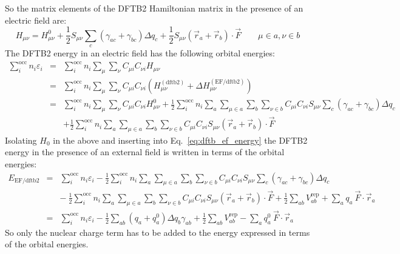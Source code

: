 \documentclass{article}
\numberwithin{equation}{section}
\begin{document}
So the matrix elements of the DFTB2 Hamiltonian matrix in the presence of an electric field  are:
\begin{equation}
    H_{\mu\nu} = H^0_{\mu\nu} + \frac{1}{2}S_{\mu\nu} \sum_c \left( \gamma_{ac} + \gamma_{bc} \right)\Delta q_c  + \frac{1}{2} S_{\mu\nu} \left( \vec{r}_a + \vec{r}_b \right) \cdot \vec{F}  \qquad \mu \in a, \nu \in b \label{eq:dftb_ef_hamil}
\end{equation}
The DFTB2 energy in an electric field has the following orbital energies:
\begin{eqnarray}
    \sum_i^\mathrm{occ} n_i \varepsilon_i 
    &=& \sum_i^\mathrm{occ} n_i \sum_{\mu} \sum_{\nu}  C_{\mu i} C_{\nu i} H_{\mu\nu}\nonumber\\
    &=& \sum_i^\mathrm{occ} n_i \sum_{\mu} \sum_{\nu}  C_{\mu i} C_{\nu i} \left(H_{\mu\nu}^{\mathrm{(dftb2)}} + \Delta H_{\mu\nu}^{\mathrm{(EF/dftb2)}} \right)\nonumber\\
    &=& \sum_i^\mathrm{occ} n_i \sum_{\mu} \sum_{\nu}  C_{\mu i} C_{\nu i} H_{\mu\nu}^0
    + \frac{1}{2} \sum_i^\mathrm{occ} n_i \sum_a \sum_{\mu \in a} \sum_b \sum_{\nu \in b}  C_{\mu i} C_{\nu i} S_{\mu\nu} \sum_c \left( \gamma_{ac} + \gamma_{bc} \right)\Delta q_c \nonumber\\
    && + \frac{1}{2} \sum_i^\mathrm{occ} n_i \sum_a \sum_{\mu \in a} \sum_b \sum_{\nu \in b}  C_{\mu i} C_{\nu i} 
    S_{\mu\nu} \left( \vec{r}_a + \vec{r}_b \right) \cdot \vec{F} \label{eq:orbital_energies_ef}
\end{eqnarray}
Isolating $H_0$ in the above and inserting into Eq.~\ref{eq:dftb_ef_energy} the DFTB2 energy in the presence of an external field is written in terms of the orbital energies:
\begin{eqnarray}
    E_\mathrm{EF/dftb2}  
    &=& \sum_i^\mathrm{occ} n_i \varepsilon_i - \frac{1}{2} \sum_i^\mathrm{occ} n_i \sum_a \sum_{\mu \in a} \sum_b \sum_{\nu \in b}  C_{\mu i} C_{\nu i} S_{\mu\nu} \sum_c \left( \gamma_{ac} + \gamma_{bc} \right)\Delta q_c \nonumber\\
    && -\ \frac{1}{2} \sum_i^\mathrm{occ} n_i \sum_a \sum_{\mu \in a} \sum_b \sum_{\nu \in b}  C_{\mu i} C_{\nu i} 
    S_{\mu\nu} \left( \vec{r}_a + \vec{r}_b \right) \cdot \vec{F}  + \frac{1}{2} \sum_{ab} V^\mathrm{rep}_{ab} + \sum_a q_a\ \vec{F} \cdot \vec{r}_a \nonumber\\
    &=& \sum_i^\mathrm{occ} n_i \varepsilon_i - \frac{1}{2}\sum_{ab} \left(q_a + q_a^0 \right)\Delta q_b \gamma_{ab} + \frac{1}{2} \sum_{ab} V^\mathrm{rep}_{ab}  - \sum_a q^0_a\ \vec{F} \cdot \vec{r}_a
\end{eqnarray}
So only the nuclear charge term has to be added to the energy expressed in terms of the orbital energies.
\end{document}

